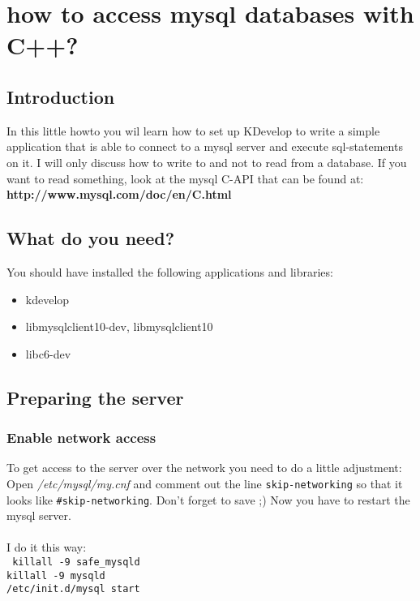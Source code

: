 \section{how to access mysql databases with C++?}
\subsection{Introduction}
In this little howto you wil learn how to set up KDevelop to write a simple application that is able to connect to a mysql server and execute sql-statements on it. I will only discuss how to write to and not to read from a database. If you want to read something, look at the mysql C-API that can be found at: \textbf{http://www.mysql.com/doc/en/C.html}

\subsection{What do you need?}
You should have installed the following applications and libraries:

\begin{itemize}
\item kdevelop
\item libmysqlclient10-dev, libmysqlclient10
\item libc6-dev
\end{itemize} 

\subsection{Preparing the server}
\subsubsection{Enable network access}
To get access to the server over the network you need to do a little adjustment:
Open \textit{/etc/mysql/my.cnf} and comment out the line \texttt{skip-networking} so that it looks like \texttt{\#skip-networking}.
Don't forget to save ;) Now you have to restart the mysql server.\\\\
I do it this way:\\
\texttt{
killall -9 safe\_mysqld\\
killall -9 mysqld\\
/etc/init.d/mysql start\\
}

